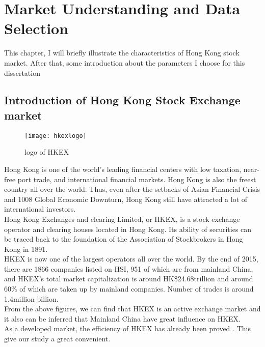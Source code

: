 \chapter{Market Understanding and Data Selection}

\label{ch:market}

This chapter, I will briefly illustrate the characteristics of Hong Kong stock market. After that, some introduction about the parameters I choose for this dissertation

\section{Introduction of Hong Kong Stock Exchange market}

\begin{figure}[h]
	\centering
	\texttt{[image: hkexlogo]}
	\caption{logo of HKEX}
\end{figure}

Hong Kong is one of the world’s leading financial centers with low taxation, near-free port trade, and international financial markets. Hong Kong is also the freest country all over the world\cite{freedom_ranking_2016}. Thus, even after the setbacks of Asian Financial Crisis and 1008 Global Economic Downturn, Hong Kong still have attracted a lot of international investors.\\

Hong Kong Exchanges and clearing Limited, or HKEX, is a stock exchange operator and clearing houses located in Hong Kong. Its ability of securities can be traced back to the foundation of the Association of Stockbrokers in Hong Kong in 1891\cite{1_history_hkex_markets_2016}.\\

HKEX is now one of the largest operators all over the world. By the end of 2015, there are 1866 companies listed on HSI, 951 of which are from mainland China, and HKEX’s total market capitalization is around HK\$24.68trillion and around 60\% of which are taken up by mainland companies. Number of trades is around 1.4million billion\cite{hkex_fact_book_2015}.\\

From the above figures, we can find that HKEX is an active exchange market and it also can be inferred that Mainland China have great influence on HKEX.\\

As a developed market, the efficiency of HKEX has already been proved \cite{su2015efficiency}. This give our study a great convenient.

